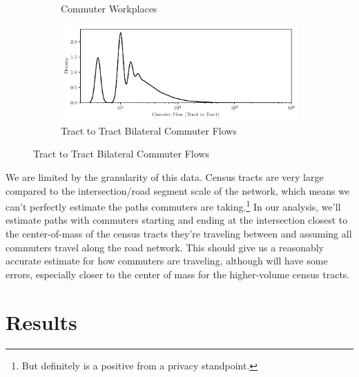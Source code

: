 \documentclass[11pt]{article}
\numberwithin{equation}{section} %
\numberwithin{figure}{section} %
\numberwithin{table}{section} %
\theoremstyle{definition}
\begin{document}
\begin{figure}[t!]
\begin{subfigure}{0.49\textwidth}
    \caption{Commuter Workplaces}
  \end{subfigure}
  \begin{subfigure}{\textwidth}
    \centering
    \includegraphics[width=\textwidth]{graphs/tract_flows.pdf}
    \caption{Tract to Tract Bilateral Commuter Flows}
  \end{subfigure}

  \label{fig:tracts}
\end{figure}

We are limited by the granularity of this data. Census tracts are very large compared to the intersection/road segment scale of the network, which means we can't perfectly estimate the paths commuters are taking.\footnote{But definitely is a positive from a privacy standpoint.} In our analysis, we'll estimate paths with commuters starting and ending at the intersection closest to the center-of-mass of the census tracts they're traveling between and assuming all commuters travel along the road network. This should give us a reasonably accurate estimate for how commuters are traveling, although will have some errors, especially closer to the center of mass for the higher-volume census tracts.



\section{Results} \label{results}






\clearpage
\printbibliography
\end{document}

